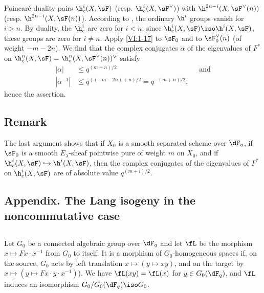 \documentclass[oneside]{book}
\begin{document}
Poincaré duality pairs $\h_c^i(X,\sF)$ (resp. 
$\h_c^i(X,\sF^\vee)$) with $\h^{2n-i}(X,\sF^\vee(n))$ (resp. 
$\h^{2n-i}(X,\sF(n))$). According to \cite[XIV 3.2]{sga4}, the ordinary $\h^i$ groups 
vanish for $i>n$. By duality, the $\h_c^i$ are zero for $i<n$; since 
$\h_c^i(X,\sF) \iso \h^i(X,\sF)$, these groups are zero for $i\ne n$. 
Apply \ref{VI:1-17} to $\sF_0$ and to $\sF_0^\vee(n)$ (of weight 
$-m-2n$). We find that the complex conjugates $\alpha$ of the eigenvalues 
of $F^\ast$ on $\h_c^n(X,\sF) = \h_c^n(X,\sF^\vee(n))^\vee$ satisfy 
\begin{align*}
  |\alpha| &\leqslant q^{(m+n)/2} && \text{and} \\
  |\alpha^{-1}| &\leqslant q^{((-m-2n)+n)/2} = q^{-(m+n)/2} \text{,}
\end{align*}
hence the assertion. 





\subsection{Remark}\label{VI:1-21}

The last argument shows that if $X_0$ is a smooth separated scheme over 
$\dF_q$, if $\sF_0$ is a smooth $E_\lambda$-sheaf pointwise pure of weight 
$m$ on $X_0$, and if $\h_c^i(X,\sF) \hookrightarrow \h^i(X,\sF)$, then the 
complex conjugates of the eigenvalues of $F^\ast$ on $\h_c^i(X,\sF)$ are 
of absolute value $q^{(m+i)/2}$. 





\subsection*{Appendix. The Lang isogeny in the noncommutative case}




\subsection{}\label{VI:1-22}

Let $G_0$ be a connected algebraic group over $\dF_q$ and let $\fL$ be the morphism 
$x\mapsto F x\cdot x^{-1}$ from $G_0$ to itself. It is a morphism of 
$G_0$-homogeneous spaces if, on the source, $G_0$ acts by left translation 
$x\mapsto (y\mapsto x y)$, and on the target by 
$x\mapsto (y\mapsto F x\cdot y\cdot x^{-1})$). We have $\fL(xy) = \fL(x)$ for 
$y\in G_0(\dF_q)$, and $\fL$ induces an isomorphism $G_0/G_0(\dF_q)\iso G_0$. 
\end{document}
